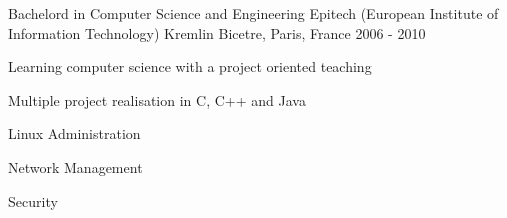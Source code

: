 

\begin{cventries}


  \cventry
    {Bachelord in Computer Science and Engineering} %
    {Epitech (European Institute of Information Technology)} %
    {Kremlin Bicetre, Paris, France} %
    {2006 - 2010} %
    {
      \begin{cvitems} %
        \item {Learning computer science with a project oriented teaching}
        \item {Multiple project realisation in C, C++ and Java}
        \item {Linux Administration}
        \item {Network Management}
        \item {Security}
      \end{cvitems}
    }

\end{cventries}
